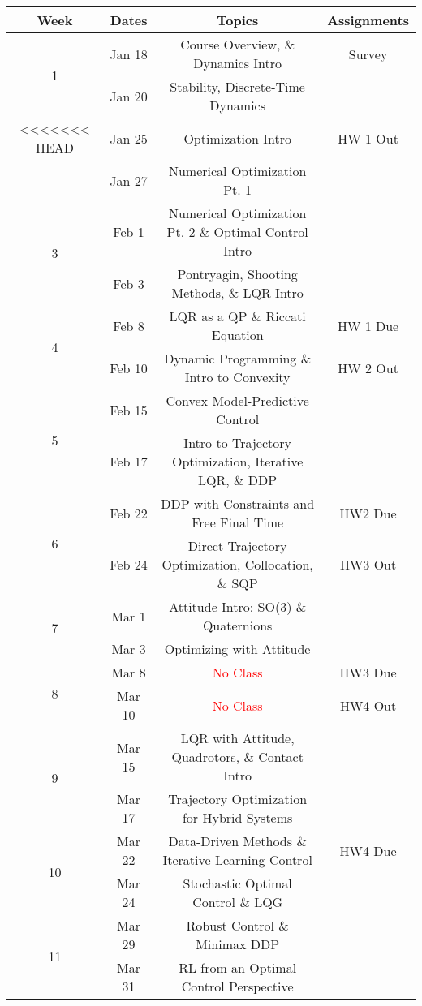 \documentclass[11pt,letterpaper]{article}
\begin{document}
\begin{tabular}{c|c|c|c}
	Week & Dates & Topics & Assignments \\
	\hline
	\multirow{2}{*}{1} & Jan 18 & Course Overview, \& Dynamics Intro & Survey \\
	 & Jan 20 & Stability, Discrete-Time Dynamics &  \\
	\hline
<<<<<<< HEAD
	\multirow{2}{*}{2} & Jan 25 & Optimization Intro & HW 1 Out \\
	 & Jan 27 & Numerical Optimization Pt. 1 &  \\
	\hline
	\multirow{2}{*}{3}  & Feb 1 & Numerical Optimization Pt. 2 \& Optimal Control Intro &  \\
	 & Feb 3 & Pontryagin, Shooting Methods, \& LQR Intro &  \\
	\hline
	\multirow{2}{*}{4}  & Feb 8 & LQR as a QP \& Riccati Equation & HW 1 Due \\
	 & Feb 10 & Dynamic Programming \& Intro to Convexity  & HW 2 Out \\
	\hline
	\multirow{2}{*}{5}  & Feb 15 & Convex Model-Predictive Control & \\
	 & Feb 17 & Intro to Trajectory Optimization, Iterative LQR, \& DDP &  \\
	\hline
	\multirow{2}{*}{6}  & Feb 22 & DDP with Constraints and Free Final Time &   HW2 Due \\
	 & Feb 24 & Direct Trajectory Optimization, Collocation, \& SQP & HW3 Out \\
	\hline
	\multirow{2}{*}{7}  & Mar 1 & Attitude Intro: SO(3) \& Quaternions  & \\
	 & Mar 3 & Optimizing with Attitude & \\
	\hline
	\multirow{2}{*}{8}  & Mar 8 & \textcolor{red}{No Class} & HW3 Due\\
	 & Mar 10 & \textcolor{red}{No Class} & HW4 Out  \\
	\hline
	\multirow{2}{*}{9}  & Mar 15 & LQR with Attitude, Quadrotors, \& Contact Intro &  \\
	 & Mar 17 & Trajectory Optimization for Hybrid Systems &   \\
	\hline
	\multirow{2}{*}{10}  & Mar 22 & Data-Driven Methods \& Iterative Learning Control &  HW4 Due \\
	 & Mar 24 & Stochastic Optimal Control \& LQG &   \\
	 \hline
	\multirow{2}{*}{11}  & Mar 29 & Robust Control \& Minimax DDP &  \\
	 & Mar 31 & RL from an Optimal Control Perspective &   \\

\end{tabular}
\end{document}
